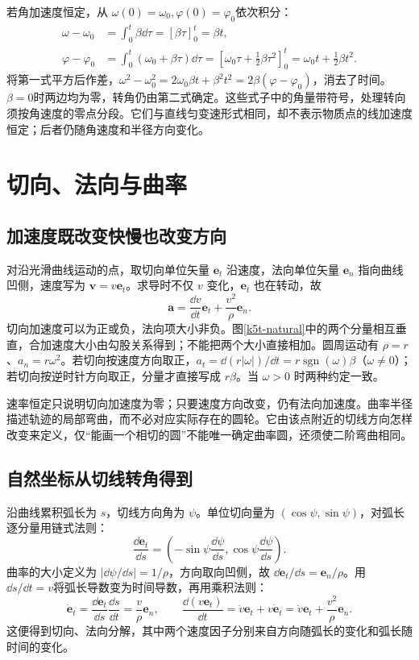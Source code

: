 若角加速度恒定，从 $\omega(0)=\omega_0,\varphi(0)=\varphi_0$依次积分：
\begin{align*}
 \omega-\omega_0&=\int_0^t\beta\dd\tau=[\beta\tau]_0^t=\beta t,\\
 \varphi-\varphi_0&=\int_0^t(\omega_0+\beta\tau)\dd\tau
 =[\omega_0\tau+\tfrac12\beta\tau^2]_0^t
 =\omega_0t+\tfrac12\beta t^2.
\end{align*}
将第一式平方后作差，$\omega^2-\omega_0^2=2\omega_0\beta t+\beta^2t^2=2\beta(\varphi-\varphi_0)$，消去了时间。$\beta=0$时两边均为零，转角仍由第二式确定。这些式子中的角量带符号，处理转向须按角速度的零点分段。它们与直线匀变速形式相同，却不表示物质点的线加速度恒定；后者仍随角速度和半径方向变化。

\section{切向、法向与曲率}
\subsection{加速度既改变快慢也改变方向}
对沿光滑曲线运动的点，取切向单位矢量 $\bm e_t$ 沿速度，法向单位矢量 $\bm e_n$ 指向曲线凹侧，速度写为 $\bm v=v\bm e_t$。求导时不仅 $v$ 变化，$\bm e_t$ 也在转动，故
\[\bm a=\frac{\dd v}{\dd t}\bm e_t+\frac{v^2}{\rho}\bm e_n.\]
切向加速度可以为正或负，法向项大小非负。图\ref{k5t-natural}中的两个分量相互垂直，合加速度大小由勾股关系得到；不能把两个大小直接相加。圆周运动有 $\rho=r$、$a_n=r\omega^2$。若切向按速度方向取正，$a_t=\dd(r|\omega|)/\dd t=r\operatorname{sgn}(\omega)\beta$（$\omega\ne0$）；若切向按逆时针方向取正，分量才直接写成 $r\beta$。当 $\omega>0$ 时两种约定一致。

速率恒定只说明切向加速度为零；只要速度方向改变，仍有法向加速度。曲率半径描述轨迹的局部弯曲，而不必对应实际存在的圆轮。它由该点附近的切线方向怎样改变来定义，仅“能画一个相切的圆”不能唯一确定曲率圆，还须使二阶弯曲相同。

\subsection{自然坐标从切线转角得到}
沿曲线累积弧长为 $s$，切线方向角为 $\psi$。单位切向量为 $(\cos\psi,\sin\psi)$，对弧长逐分量用链式法则：
\[
 \frac{\dd\bm e_t}{\dd s}
 =\left(-\sin\psi\frac{\dd\psi}{\dd s},
 \cos\psi\frac{\dd\psi}{\dd s}\right).
\]
曲率的大小定义为 $|\dd\psi/\dd s|=1/\rho$，方向取向凹侧，故 $\dd\bm e_t/\dd s=\bm e_n/\rho$。用 $\dd s/\dd t=v$将弧长导数变为时间导数，再用乘积法则：
\[
 \dot{\bm e}_t=\frac{\dd\bm e_t}{\dd s}\frac{\dd s}{\dd t}
 =\frac v\rho\bm e_n,\qquad
 \frac{\dd(v\bm e_t)}{\dd t}
 =\dot v\bm e_t+v\dot{\bm e}_t
 =\dot v\bm e_t+\frac{v^2}{\rho}\bm e_n.
\]
这便得到切向、法向分解，其中两个速度因子分别来自方向随弧长的变化和弧长随时间的变化。

